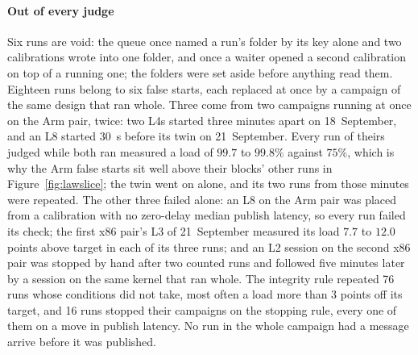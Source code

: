 \documentclass[10pt,journal,onecolumn]{IEEEtran}
\begin{document}
\paragraph{Out of every judge} Six runs are void: the queue once named a run's folder by its key
alone and two calibrations wrote into one folder, and once a waiter opened a second calibration
on top of a running one; the folders were set aside before anything read them. Eighteen runs
belong to six false starts, each replaced at once by a campaign of the same design that ran whole.
Three come from two campaigns running at once on the Arm pair, twice: two L4s started three
minutes apart on 18~September, and an L8 started 30~s before its twin on 21~September. Every run
of theirs judged while both ran measured a load of $99.7$ to $99.8\%$ against $75\%$, which is why
the Arm false starts sit well above their blocks' other runs in Figure~\ref{fig:lawslice}; the
twin went on alone, and its two runs from those minutes were repeated. The other three failed
alone: an L8 on the Arm pair was placed from a calibration with no zero-delay median publish latency, so
every run failed its check; the first x86 pair's L3 of 21~September measured its load $7.7$ to
$12.0$ points above target in each of its three runs; and an L2 session on the second x86
pair was stopped by hand after two counted runs and followed five minutes later by a session on
the same kernel that ran whole. The integrity rule repeated 76 runs
whose conditions did not take, most often a load more than 3 points off its target, and 16 runs
stopped their campaigns on the stopping rule, every one of them on a move in publish latency. No run in the whole
campaign had a message arrive before it was published.
\end{document}
